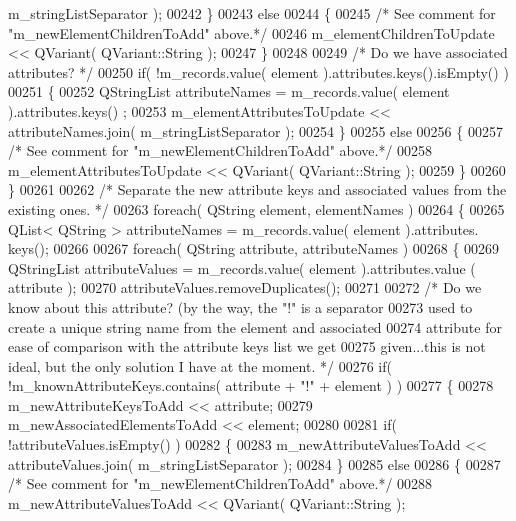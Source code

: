 \begin{DoxyCode}
      m\_stringListSeparator );
00242     \}
00243     \textcolor{keywordflow}{else}
00244     \{
00245       \textcolor{comment}{/* See comment for "m\_newElementChildrenToAdd" above.*/}
00246       m\_elementChildrenToUpdate << QVariant( QVariant::String );
00247     \}
00248 
00249     \textcolor{comment}{/* Do we have associated attributes? */}
00250     \textcolor{keywordflow}{if}( !m\_records.value( element ).attributes.keys().isEmpty() )
00251     \{
00252       QStringList attributeNames = m\_records.value( element ).attributes.keys()
      ;
00253       m\_elementAttributesToUpdate << attributeNames.join( m\_stringListSeparator
       );
00254     \}
00255     \textcolor{keywordflow}{else}
00256     \{
00257       \textcolor{comment}{/* See comment for "m\_newElementChildrenToAdd" above.*/}
00258       m\_elementAttributesToUpdate << QVariant( QVariant::String );
00259     \}
00260   \}
00261 
00262   \textcolor{comment}{/* Separate the new attribute keys and associated values from the existing
       ones. */}
00263   \textcolor{keywordflow}{foreach}( QString element, elementNames )
00264   \{
00265     QList< QString > attributeNames = m\_records.value( element ).attributes.
      keys();
00266 
00267     \textcolor{keywordflow}{foreach}( QString attribute, attributeNames )
00268     \{
00269       QStringList attributeValues = m\_records.value( element ).attributes.value
      ( attribute );
00270       attributeValues.removeDuplicates();
00271 
00272       \textcolor{comment}{/* Do we know about this attribute? (by the way, the "!" is a separator}
00273 \textcolor{comment}{        used to create a unique string name from the element and associated}
00274 \textcolor{comment}{        attribute for ease of comparison with the attribute keys list we get}
00275 \textcolor{comment}{        given...this is not ideal, but the only solution I have at the moment. 
      */}
00276       \textcolor{keywordflow}{if}( !m\_knownAttributeKeys.contains( attribute + \textcolor{stringliteral}{"!"} + element ) )
00277       \{
00278         m\_newAttributeKeysToAdd << attribute;
00279         m\_newAssociatedElementsToAdd << element;
00280 
00281         \textcolor{keywordflow}{if}( !attributeValues.isEmpty() )
00282         \{
00283           m\_newAttributeValuesToAdd << attributeValues.join( 
      m\_stringListSeparator );
00284         \}
00285         \textcolor{keywordflow}{else}
00286         \{
00287           \textcolor{comment}{/* See comment for "m\_newElementChildrenToAdd" above.*/}
00288           m\_newAttributeValuesToAdd << QVariant( QVariant::String );

\end{DoxyCode}

